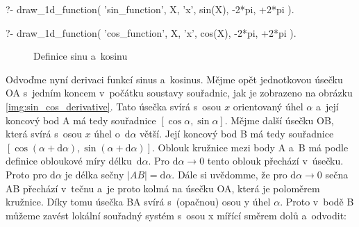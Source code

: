 \begin{prolog}
?-	draw_1d_function(
		'sin_function',
		X,
		'x',
		sin(X),
		-2*pi, +2*pi
	).				
\end{prolog}

\begin{prolog}
?-	draw_1d_function(
		'cos_function',
		X,
		'x',
		cos(X),
		-2*pi, +2*pi
	).				
\end{prolog}

\begin{figure}[ht]
\begin{center}
\caption{Definice sinu a~kosinu}
\label{img:sin_cos_def}
\end{center}
\end{figure}


Odvoďme nyní derivaci funkcí sinus a~kosinus. Mějme opět jednotkovou úsečku OA s~jedním koncem v~počátku soustavy souřadnic, jak je zobrazeno na obrázku \eqref{img:sin_cos_derivative}. Tato úsečka svírá s~osou \(x\) orientovaný úhel \(\alpha\) a~její koncový bod A má tedy souřadnice \([\cos \alpha, \sin \alpha]\). Mějme další úsečku OB, která svírá s~osou \(x\) úhel o~\(\mathrm{d}\alpha\) větší. Její koncový bod B má tedy souřadnice \([\cos (\alpha + \mathrm{d}\alpha), \sin (\alpha + \mathrm{d}\alpha)]\). Oblouk kružnice mezi body A a~B má podle definice obloukové míry délku~\(\mathrm{d}\alpha\). Pro \(\mathrm{d}\alpha \to 0\) tento oblouk přechází v~úsečku. Proto pro \(\mathrm{d}\alpha\) je délka sečny \(|AB| = \mathrm{d}\alpha\). Dále si uvědomme, že pro \(\mathrm{d}\alpha \to 0\) sečna AB přechází v~tečnu a~je proto kolmá na úsečku OA, která je poloměrem kružnice. Díky tomu úsečka BA svírá s~(opačnou) osou y úhel \(\alpha\). Proto v~bodě B můžeme zavést lokální souřadný systém s~osou x mířící směrem dolů a~odvodit:

